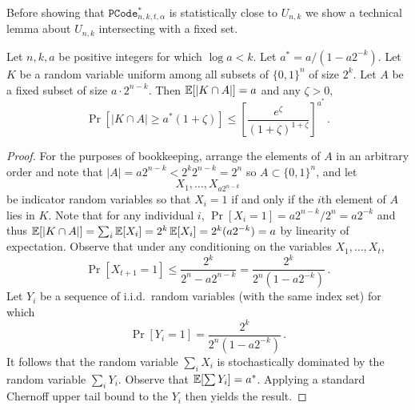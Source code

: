  Before showing that $\mathtt{PCode}_{n, k, t, \alpha}^{*}$ is statistically close to $U_{n,k}$ we show a technical lemma about $U_{n,k}$ intersecting with a fixed set. 
  \begin{lemma}
  \label{lem:chernoff independence}
  Let $n,k,a$ be positive integers for which $\log a < k$.  Let $a^* = a/(1 - a2^{-k})$. Let $K$
  be a random variable uniform among all subsets of $\{0,1\}^n$ of
  size $2^k$. Let $A$ be a fixed subset of size $a \cdot 2^{n-k}$. Then
  $\operatorname*{\mathbb{E}}[|K \cap A|] = a$ and any $\zeta > 0$,
  \[
    \Pr[|K \cap A| \geq a^*(1 + \zeta)] \leq \left[\frac{e^\zeta}{(1+\zeta)^{1+\zeta}}\right]^{a^*}\,.
  \]
\end{lemma}
\begin{proof}
  For the purposes of bookkeeping, arrange the elements of $A$ in an
  arbitrary order and note that $|A| = a2^{n-k} < 2^k2^{n-k} = 2^n$ so $A\subset \{0,1\}^n$, and let
  \[
    X_1, \ldots, X_{a2^{n-k}}
  \]
  be indicator random variables so that $X_i = 1$ if and only if the
  $i$th element of $A$ lies in $K$.  Note that for any individual $i$, $\Pr[X_i =1] =a2^{n-k}/2^n = a2^{-k}$ and thus $\operatorname*{\mathbb{E}}[|K\cap A|] =\sum_i \operatorname*{\mathbb{E}}[X_i] = 2^k \operatorname*{\mathbb{E}}[X_i] =2^k (a2^{-k})= a$ by linearity of expectation.  Observe that under any conditioning on the
  variables $X_1, \ldots, X_t$,
  \[
    \Pr[X_{t+1} = 1] \leq \frac{2^k}{2^n - a2^{n-k}} = \frac{2^k}{2^n(1 - a2^{-k})}\,.
  \]
   Let $Y_i$ be a sequence of
  i.i.d.\ random variables (with the same index set) for which
  \[
    \Pr[Y_i = 1] = \frac{2^{k}}{2^n(1 - a2^{-k})}\,.
  \]It follows that the random variable $\sum_i X_i$ is stochastically
  dominated by the random variable $\sum_i Y_i$. Observe that
  $\operatorname*{\mathbb{E}}[\sum Y_i] = a^*$. Applying a standard Chernoff upper tail
  bound to the $Y_i$ then yields the result.
\end{proof}


